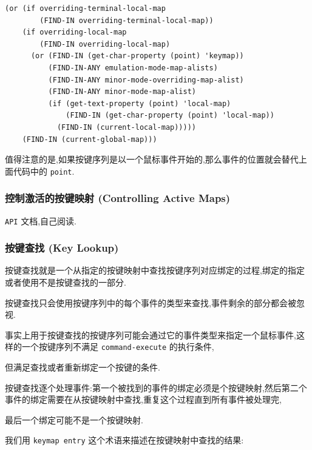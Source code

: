 \documentclass[11pt]{article}
\begin{document}
\begin{verbatim}
(or (if overriding-terminal-local-map
        (FIND-IN overriding-terminal-local-map))
    (if overriding-local-map
        (FIND-IN overriding-local-map)
      (or (FIND-IN (get-char-property (point) 'keymap))
          (FIND-IN-ANY emulation-mode-map-alists)
          (FIND-IN-ANY minor-mode-overriding-map-alist)
          (FIND-IN-ANY minor-mode-map-alist)
          (if (get-text-property (point) 'local-map)
              (FIND-IN (get-char-property (point) 'local-map))
            (FIND-IN (current-local-map)))))
    (FIND-IN (current-global-map)))
\end{verbatim}

值得注意的是,如果按键序列是以一个鼠标事件开始的,那么事件的位置就会替代上面代码中的 \texttt{point}.


\subsubsection{控制激活的按键映射 (Controlling Active Maps)}
\label{sec:org4d40d81}

\texttt{API} 文档,自己阅读.


\subsubsection{按键查找 (Key Lookup)}
\label{sec:orge91da4a}

按键查找就是一个从指定的按键映射中查找按键序列对应绑定的过程,绑定的指定或者使用不是按键查找的一部分.

按键查找只会使用按键序列中的每个事件的类型来查找,事件剩余的部分都会被忽视.

事实上用于按键查找的按键序列可能会通过它的事件类型来指定一个鼠标事件,这样的一个按键序列不满足 \texttt{command-execute} 的执行条件,

但满足查找或者重新绑定一个按键的条件.

按键查找逐个处理事件:第一个被找到的事件的绑定必须是个按键映射,然后第二个事件的绑定需要在从按键映射中查找,重复这个过程直到所有事件被处理完,

最后一个绑定可能不是一个按键映射.

我们用 \texttt{keymap entry} 这个术语来描述在按键映射中查找的结果:
\end{document}
